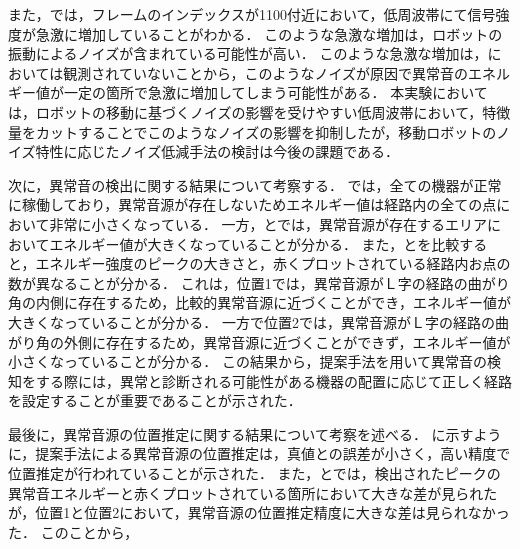 \documentclass[../main]{subfiles}
\begin{document}
また，では，フレームのインデックスが1100付近において，低周波帯にて信号強度が急激に増加していることがわかる．
このような急激な増加は，ロボットの振動によるノイズが含まれている可能性が高い．
このような急激な増加は，においては観測されていないことから，このようなノイズが原因で異常音のエネルギー値が一定の箇所で急激に増加してしまう可能性がある．
本実験においては，ロボットの移動に基づくノイズの影響を受けやすい低周波帯において，特徴量をカットすることでこのようなノイズの影響を抑制したが，移動ロボットのノイズ特性に応じたノイズ低減手法の検討は今後の課題である．

次に，異常音の検出に関する結果について考察する．
では，全ての機器が正常に稼働しており，異常音源が存在しないためエネルギー値は経路内の全ての点において非常に小さくなっている．
一方，とでは，異常音源が存在するエリアにおいてエネルギー値が大きくなっていることが分かる．
また，とを比較すると，エネルギー強度のピークの大きさと，赤くプロットされている経路内お点の数が異なることが分かる．
これは，位置1では，異常音源がＬ字の経路の曲がり角の内側に存在するため，比較的異常音源に近づくことができ，エネルギー値が大きくなっていることが分かる．
一方で位置2では，異常音源がＬ字の経路の曲がり角の外側に存在するため，異常音源に近づくことができず，エネルギー値が小さくなっていることが分かる．
この結果から，提案手法を用いて異常音の検知をする際には，異常と診断される可能性がある機器の配置に応じて正しく経路を設定することが重要であることが示された．


最後に，異常音源の位置推定に関する結果について考察を述べる．
に示すように，提案手法による異常音源の位置推定は，真値との誤差が小さく，高い精度で位置推定が行われていることが示された．
また，とでは，検出されたピークの異常音エネルギーと赤くプロットされている箇所において大きな差が見られたが，位置1と位置2において，異常音源の位置推定精度に大きな差は見られなかった．
このことから，
\end{document}
